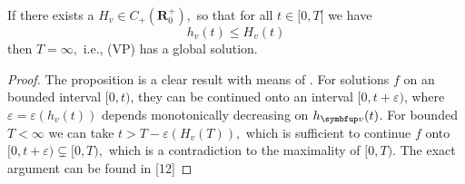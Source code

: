 \begin{proposition}
  If there exists a $H_{v} \in C_{+}\left(\mathbf{R}_{0}^{+}\right),$ so that for all $t \in[0, T[$ we have
\[
h_{v}(t) \leqslant H_{v}(t)
\]
then $T=\infty,$ i.e., (VP) has a global solution.
\end{proposition}


\begin{proof}
    The proposition is a clear result with means of \cite{HorstClasssicalI}. For solutions $f$ on an bounded interval $[0, t)$,  they can be continued onto an interval $[0, t+\varepsilon)$,  where $\varepsilon=\varepsilon(h_{v}(t))$ depends monotonically decreasing on $h_{\vv}(t)$. For bounded $T<\infty$ we can take $t>T-\varepsilon\left(H_{v}(T)\right),$ which is sufficient to continue $f$ onto $[0, t+\varepsilon)\subsetneq[0, T),$ which is a contradiction to the maximality of $[0, T)$.  The exact argument can be found in [12]

\end{proof}








